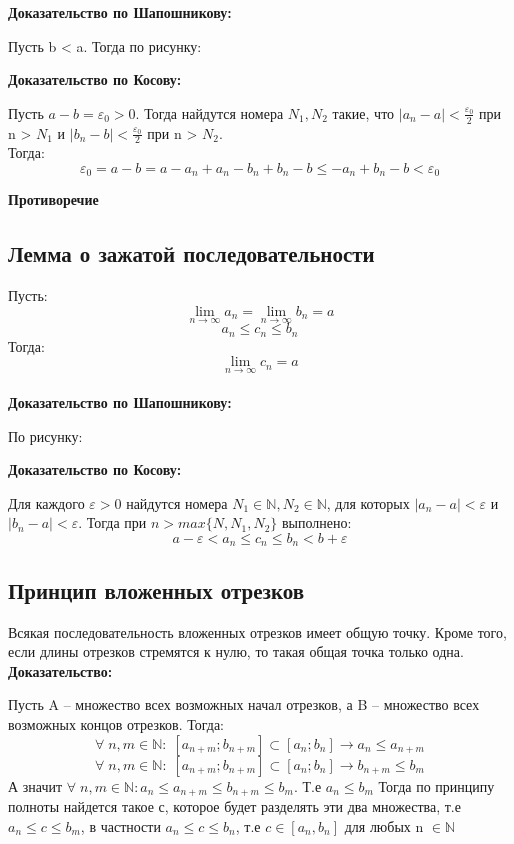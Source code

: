 \documentclass[a4paper,12pt]{article}
\begin{document}
\textbf{Доказательство по Шапошникову:}

Пусть b < a. Тогда по рисунку:



\textbf{Доказательство по Косову:}


Пусть $a - b = \varepsilon_0 > 0$. Тогда найдутся номера $N_1, N_2$ такие, что $|a_n - a| < \frac{\varepsilon_0}{2}$ при n > $N_1$ и $|b_n - b| < \frac{\varepsilon_0}{2}$ при n > $N_2$.
\\
Тогда:
\[
\varepsilon_0 = a - b = a - a_n  + a_n - b_n + b_n - b \leq  - a_n + b_n - b < \varepsilon_0
\]
\begin{center}
\textbf{Противоречие}
\end{center}
\subsection*{Лемма о зажатой последовательности}
Пусть:
\[
\lim_{n \rightarrow \infty} a_n = \lim_{n \rightarrow \infty} b_n = a
\]
\[
a_n \leq c_n \leq b_n 
\]
Тогда:
\[
\lim_{n \rightarrow \infty} c_n = a
\]
\\

\textbf{Доказательство по Шапошникову:}

По рисунку:

\textbf{Доказательство по Косову:}

Для каждого $\varepsilon > 0$ найдутся номера  $N_1 \in \mathbb{N},N_2 \in \mathbb{N}$, для которых $|a_n - a| < \varepsilon$ и $|b_n -  a| < \varepsilon$. Тогда при $n > max \{N, N_1, N_2\}$ выполнено:
\[
a - \varepsilon < a_n \leq c_n \leq b_n < b + \varepsilon
\]
\subsection*{Принцип вложенных отрезков}
Всякая последовательность вложенных отрезков имеет общую точку. Кроме того, если длины отрезков стремятся к нулю, то такая общая точка только одна.
\\

\textbf{Доказательство:}

Пусть A -- множество всех возможных начал отрезков, а B -- множество всех возможных концов отрезков. Тогда:
\[
\forall \; n, m \in \mathbb{N} :\; [a_{n+m};b_{n+m}] \subset [a_n; b_n] \rightarrow a_n \leq a_{n+m}
\]
\[
\forall \; n, m \in \mathbb{N} :\; [a_{n+m};b_{n+m}] \subset [a_n; b_n] \rightarrow b_{n+m} \leq b_m
\]
А значит $
\forall \; n, m \in \mathbb{N}: a_n \leq a_{n+m} \leq b_{n+m} \leq b_m
$.
Т.е $
a_n \leq b_m $
Тогда по принципу полноты найдется такое с, которое будет разделять эти два множества, т.е $a_n \leq c \leq b_m$,  в частности $a_n \leq c \leq b_n$, т.е $ c \in [a_n, b_n] $ для любых n $\in \mathbb{N}$
\end{document}
